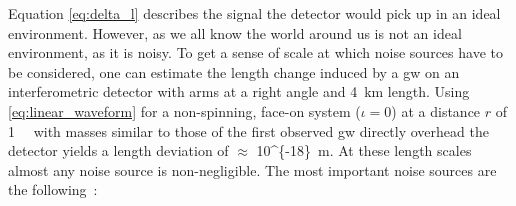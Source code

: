Equation \eqref{eq:delta_l} describes the signal the detector would pick up in an ideal environment. However, as we all know the world around us is not an ideal environment, as it is noisy. To get a sense of scale at which noise sources have to be considered, one can estimate the length change induced by a \acrshort{gw} on an interferometric detector with arms at a right angle and \SI{4}{\kilo\metre} length. Using \eqref{eq:linear_waveform} for a non-spinning, face-on system ($\iota=0$) at a distance $r$ of \SI{1}{\giga\parsec} with masses similar to those of the first observed \acrshort{gw} directly overhead the detector yields a length deviation of $\approx$ \SI[parse-numbers=false]{10^{-18}}{\metre}. At these length scales almost any noise source is non-negligible. The most important noise sources are the following~\cite{Pitkin:2011yk, LIGOScientific:2014pky, VIRGO:2014yos}:
